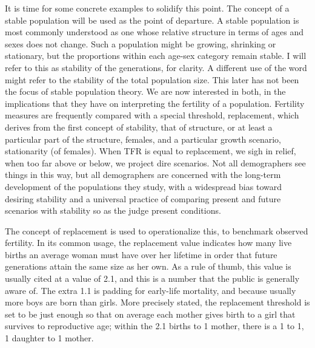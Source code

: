 \documentclass[reqno,12pt,oneside,a4paper]{report} %
\theoremstyle{plain}
\theoremstyle{definition}
\theoremstyle{remark}
\numberwithin{theorem}{chapter}     %
\begin{document}
It is time for some concrete examples to solidify this point. The concept of a stable population will be used as the point of departure. A stable population is most commonly understood as one whose relative structure in terms of ages and sexes does not change. Such a population might be growing, shrinking or stationary, but the proportions within each age-sex category remain stable. I will refer to this as stability of the generations, for clarity. A different use of the word might refer to the stability of the total population size. This later has not been the focus of stable population theory. We are now interested in both, in the implications that they have on interpreting the fertility of a population. Fertility measures are frequently compared with a special threshold, replacement, which derives from the first concept of stability, that of structure, or at least a particular part of the structure, females, and a particular growth scenario, stationarity (of females). When TFR is equal to replacement, we sigh in relief, when too far above or below, we project dire scenarios. Not all demographers see things in this way, but all demographers are concerned with the long-term development of the populations they study, with a widespread bias toward desiring stability and a universal practice of comparing present and future scenarios with stability so as the judge present conditions.

The concept of replacement is used to operationalize this, to benchmark observed fertility. In its common usage, the replacement value indicates how many live births an average woman must have over her lifetime in order that future generations attain the same size as her own. As a rule of thumb, this value is usually cited at a value of 2.1, and this is a number that the public is generally aware of. The extra 1.1 is padding for early-life mortality, and because usually more boys are born than girls. More precisely stated, the replacement threshold is set to be just enough so that on average each mother gives birth to a girl that survives to reproductive age; within the 2.1 births to 1 mother, there is a 1 to 1, 1 daughter to 1 mother.
\end{document}
